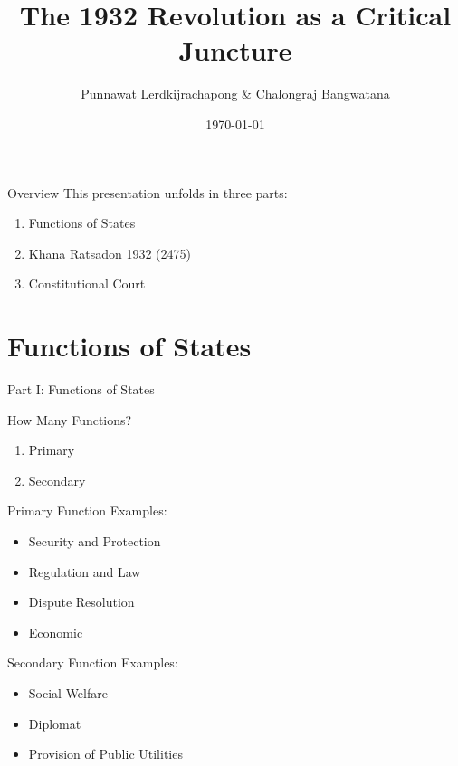 \documentclass[aspectratio=169]{beamer}
\title[The 1932 Revolution as a Critical Juncture]{The 1932 Revolution as a Critical Juncture}
\author[P.\,Lerdkijrachapong \& C. Bangwatana]{Punnawat Lerdkijrachapong \& Chalongraj Bangwatana}
\institute[Study Group]{Study Group 2}
\date{\today}
\begin{document}
\begin{frame}
  \titlepage
\end{frame}

\begin{frame}{Overview}
  This presentation unfolds in three parts:
  \begin{enumerate}[<+->]
  	\item Functions of States
    \item Khana Ratsadon 1932 (2475)
    \item Constitutional Court
  \end{enumerate}
\end{frame}

\section{Functions of States}

\begin{frame}{Part I: Functions of States}
	\begin{block}{How Many Functions?}
		\begin{enumerate}
			\item Primary
			\item Secondary
		\end{enumerate}
	\end{block}
\end{frame}

\begin{frame}{Primary Function}
Examples:
		\begin{itemize}
			\item Security and Protection
			\item Regulation and Law
			\item Dispute Resolution
			\item Economic
		\end{itemize}
\end{frame}

\begin{frame}{Secondary Function}
Examples:
	\begin{itemize}
		\item Social Welfare
		\item Diplomat
		\item Provision of Public Utilities
	\end{itemize}
\end{frame}
\end{document}
